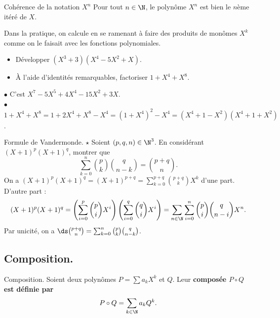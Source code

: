 \documentclass[11pt]{article}
\begin{document}
\begin{prop}{Cohérence de la notation $X^n$}{}
    Pour tout $n\in\N$, le polynôme $X^n$ est bien le $n$ème itéré de $X$.
\end{prop}

\begin{ex}{}{}
    Dans la pratique, on calcule en se ramenant à faire des produits de monômes $X^k$ comme on le faisait avec les fonctions polynomiales.
    \begin{itemize}
        \item Développer $(X^3+3)(X^4-5X^2+X)$.
        \item À l'aide d'identités remarquables, factoriser $1+X^4+X^8$.
    \end{itemize}
    \tcblower
    $\bullet$ C'est $X^7-5X^5+4X^4-15X^2+3X$.\\
    $\bullet$ $1+X^4+X^8=1+2X^4+X^8-X^4=(1+X^4)^2-X^4=(X^4+1-X^2)(X^4+1+X^2)$.
\end{ex}

\vspace*{-0.8cm}

\begin{ex}{Formule de Vandermonde. $\star$}{}
    Soient $(p,q,n)\in\N^3$. En considérant $(X+1)^p(X+1)^q$, montrer que
    \begin{equation*}
        \sum_{k=0}^n\binom{p}{k}\binom{q}{n-k}=\binom{p+q}{n}.
    \end{equation*}
    \tcblower
    On a $(X+1)^p(X+1)^q=(X+1)^{p+q}=\sum_{k=0}^{p+q}\binom{p+q}{k}X^k$ d'une part. D'autre part :
    \begin{equation*}
        (X+1)^p(X+1)^q=\left(\sum_{i=0}^p\binom{p}{i}X^i\right)\left( \sum_{i=0}^q\binom{q}{i}X^i \right)=\sum_{n\in\N}\sum_{i=0}^n\binom{p}{i}\binom{q}{n-i}X^n.
    \end{equation*}
    Par unicité, on a $\ds\binom{p+q}{n}=\sum_{k=0}^n\binom{p}{k}\binom{q}{n-k}$.
\end{ex}

\vspace*{-0.8cm}

\subsection{Composition.}

\begin{defi}{Composition.}{}
    Soient deux polynômes $P=\sum a_kX^k$ et $Q$. Leur \bf{composée} $P\circ Q$ est définie par
    \begin{equation*}
        P\circ Q = \sum_{k\in\N}a_kQ^k.
    \end{equation*}
\end{defi}
\end{document}
